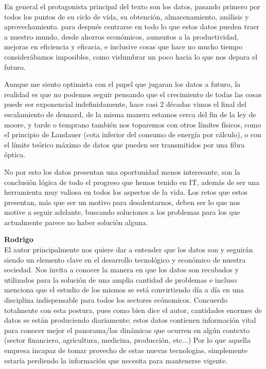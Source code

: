 \documentclass[12pt,a4paper]{article}
\begin{document}
\begin{enumerate}
\begin{enumerate}
				En general el protagonista principal del texto son los datos, pasando
				primero por todos los puntos de su ciclo de vida, su obtención, 
				almacenamiento, análisis y aprovechamiento. para después centrarse 
				en todo lo que estos datos pueden traer a nuestro mundo, desde ahorros 
				económicos, aumentos a la productividad, mejoras en eficiencia y 
				eficacia, e inclusive cosas que hace no mucho tiempo considerábamos 
				imposibles, como vislumbrar un poco hacia lo que nos depara el futuro.

				Aunque me siento optimista con el papel que jugaran los datos a 
				futuro, la realidad es que no podemos seguir pensando que el
				crecimiento de todas las cosas puede ser exponencial indefinidamente, 
				hace casi 2 décadas vimos el final del escalamiento de dennard, 
				de la misma manera estamos cerca del fin de la ley de moore, y tarde
				o temprano también nos toparemos con otros límites físicos, como el 
				principio de Landauer (cota inferior del consumo de energía por
				cálculo), o con el límite teórico máximo de datos que pueden ser
				transmitidos por una fibra óptica.

				No por esto los datos presentan una oportunidad menos interesante,
				son la conclusión lógica de todo el progreso que hemos tenido en
				IT, además de ser una herramienta muy valiosa en todos los aspectos
				de la vida. Los retos que estos presentan, más que ser un motivo
				para desalentarnos, deben ser lo que nos motive a seguir adelante,
				buscando soluciones a los problemas para los que actualmente parece
				no haber solución alguna.
				
				\textbf{Rodrigo}\\	
                      		El autor principalmente nos quiere dar a entender que los datos son 
				y seguirán siendo un elemento clave en el desarrollo tecnológico y
				económico de nuestra sociedad. Nos invita a conocer la manera en que 
				los datos son recabados y utilizados para la solución de una amplia 
				cantidad de problemas e incluso menciona que el estudio de los mismos 
				se está convirtiendo día a día en una disciplina indispensable para 
				todos los sectores ecónomicos. Concuerdo totalmente con esta postura, 
				pues como bien dice el autor, cantidades enormes de datos se están 
				produciendo diariamente; estos datos contienen información vital para 
				conocer mejor el panorama/las dinámicas que ocurren en algún contexto 
				(sector financiero, agricultura, medicina, producción, etc...) Por lo 
				que aquella empresa incapaz de tomar provecho de estas nuevas tecnologias, 
				simplemente estaría perdiendo la información que necesita para mantenerse 
				vigente.


\end{enumerate}
\end{enumerate}
\end{document}
